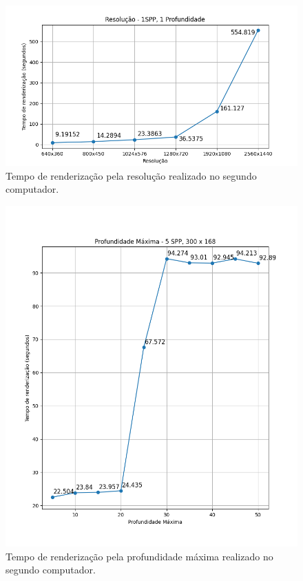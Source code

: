 \documentclass[journal]{IEEEtran}
\begin{document}
\begin{figure}[ht]
  \centering
  \includegraphics[width=\linewidth]{media/Notebook_RES.png}
  \caption{Tempo de renderização pela resolução realizado no segundo computador.}
  \label{img_notebook_res}
\end{figure}

\begin{figure}[ht]
  \centering
  \includegraphics[width=\linewidth]{media/Notebook_MD.png}
  \caption{Tempo de renderização pela profundidade máxima realizado no segundo computador.}
  \label{img_notebook_md}
\end{figure}
\end{document}
